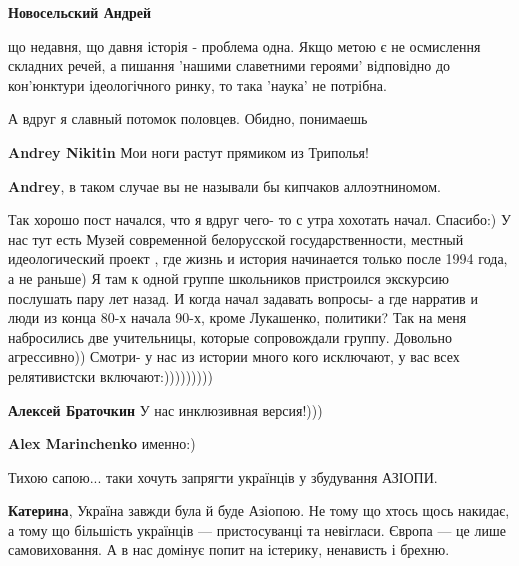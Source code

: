 \begin{itemize}
\begin{itemize}
\textbf{Новосельский Андрей} 

що недавня, що давня історія - проблема одна. Якщо метою є не осмислення
складних речей, а пишання 'нашими славетними героями' відповідно до кон'юнктури
ідеологічного ринку, то така 'наука' не потрібна.

\end{itemize} %

А вдруг я славный потомок половцев. Обидно, понимаешь

\begin{itemize} %
\textbf{Andrey Nikitin} Мои ноги растут прямиком из Триполья!

\textbf{Andrey}, в таком случае вы не называли бы кипчаков аллоэтниномом.
\end{itemize} %


Так хорошо пост начался, что я вдруг чего- то с утра хохотать начал. Спасибо:)
У нас тут есть Музей современной белорусской государственности, местный
идеологический проект , где жизнь и история начинается только после 1994 года,
а не раньше) Я там к одной группе школьников пристроился экскурсию послушать
пару лет назад. И когда начал задавать вопросы- а где нарратив и люди из конца
80-х начала 90-х, кроме Лукашенко, политики? Так на меня набросились две
учительницы, которые сопровождали группу. Довольно агрессивно)) Смотри- у нас
из истории много кого исключают, у вас всех релятивистски включают:)))))))))

\begin{itemize} %
\textbf{Алексей Браточкин} У нас инклюзивная версия!)))

\textbf{Alex Marinchenko} именно:)
\end{itemize} %

Тихою сапою... таки хочуть запрягти українців у збудування АЗІОПИ.

\begin{itemize} %
\textbf{Катерина}, Україна завжди була й буде Азіопою. Не тому що хтось щось накидає, а тому що більшість українців — пристосуванці та невігласи. Європа — це лише самовиховання. А в нас домінує попит на істерику, ненависть і брехню.
\end{itemize} %



\end{itemize}
